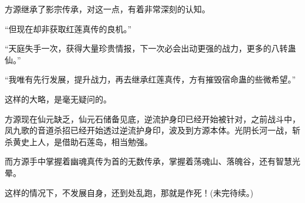 \begin{this_body}
方源继承了影宗传承，对这一点，有着非常深刻的认知。

“但现在却非获取红莲真传的良机。”

“天庭失手一次，获得大量珍贵情报，下一次必会出动更强的战力，更多的八转蛊仙。”

“我唯有先行发展，提升战力，再去继承红莲真传，方有摧毁宿命蛊的些微希望。”

这样的大略，是毫无疑问的。

方源现在仙元缺乏，仙元石储备见底，逆流护身印已经开始被针对，之前战斗中，凤九歌的音道杀招已经开始透过逆流护身印，波及到方源本体。光阴长河一战，斩杀黄史上人，是借助石莲岛，相当勉强。

而方源手中掌握着幽魂真传为首的无数传承，掌握着荡魂山、落魄谷，还有智慧光晕。

这样的情况下，不发展自身，还到处乱跑，那就是作死！(未完待续。)

\end{this_body}

